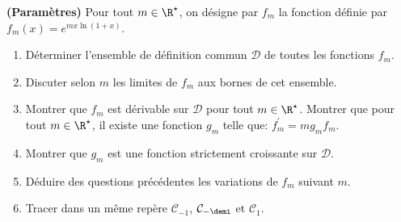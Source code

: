 
\begin{exercice}  \;
\textbf{(Param\`etres)}
Pour tout $m\in\R^{\star}$, on d\'esigne par $f_m$ la fonction d\'efinie par $f_m(x)=e^{mx\ln{(1+x)}}$.
\begin{enumerate}
\item D\'eterminer l'ensemble de d\'efinition commun $\mathcal{D}$ de toutes les fonctions $f_m$.
\item Discuter selon $m$ les limites de $f_m$ aux bornes de cet ensemble.
\item Montrer que $f_m$ est d\'erivable sur $\mathcal{D}$ pour tout $m\in\R^{\star}$. Montrer que pour tout $m\in\R^{\star}$, il existe une fonction $g_m$ telle que: $f^{\prime}_m=mg_mf_m$.
\item Montrer que $g_m$ est une fonction strictement croissante sur $\mathcal{D}$.
\item D\'eduire des questions pr\'ec\'edentes les variations de $f_m$ suivant $m$.
\item Tracer dans un m\^{e}me rep\`{e}re $\mathcal{C}_{-1}$, $\mathcal{C}_{-\demi}$ et $\mathcal{C}_{1}$.
\end{enumerate}
\end{exercice}